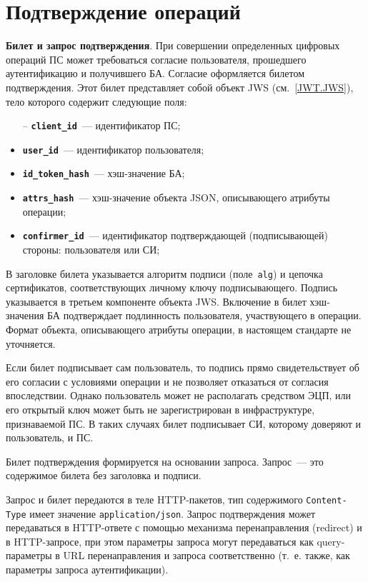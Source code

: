 \section{Подтверждение операций}\label{OIDC.Confirm}

{\bf Билет и запрос подтверждения}.
%
При совершении определенных цифровых операций ПС может требоваться
согласие пользователя, прошедшего аутентификацию и получившего БА. 
Согласие оформляется билетом подтверждения. Этот билет представляет собой 
объект JWS (см.~\ref{JWT.JWS}), тело которого содержит следующие поля: 
\begin{itemize}
\item[--] 
{\bf \lstinline{client_id}}~--- идентификатор ПС;

\item[--] 
{\bf \lstinline{user_id}}~--- идентификатор пользователя;

\item[--] 
{\bf \lstinline{id_token_hash}}~--- хэш-значение БА;

\item[--] 
{\bf \lstinline{attrs_hash}}~--- хэш-значение объекта JSON,
описывающего атрибуты операции; 

\item[--] 
{\bf \lstinline{confirmer_id}}~--- идентификатор
подтверждающей (подписывающей) стороны: пользователя или СИ;
\end{itemize}

В заголовке билета указывается алгоритм подписи (поле~\lstinline{alg})
и цепочка сертификатов, соответствующих личному ключу подписывающего.
Подпись указывается в третьем компоненте объекта JWS.
%
Включение в билет хэш-значения БА подтверждает подлинность 
пользователя, участвующего в операции.
%
Формат объекта, описывающего атрибуты операции, в настоящем стандарте не 
уточняется.

Если билет подписывает сам пользователь, 
то подпись прямо свидетельствует об его согласии с условиями
операции и не позволяет отказаться от согласия впоследствии.
%
Однако пользователь может не располагать средством ЭЦП, или его 
открытый ключ может быть не зарегистрирован в инфраструктуре,
признаваемой ПС. В таких случаях билет подписывает СИ,
которому доверяют и пользователь, и ПС. 

Билет подтверждения формируется на основании запроса.
Запрос~--- это содержимое билета без заголовка и подписи. 

Запрос и билет передаются в теле
HTTP-пакетов, тип содержимого \lstinline{Content-Type}
имеет значение \lstinline{application/json}.
Запрос подтверждения может передаваться
в HTTP-ответе с помощью механизма перенаправления (redirect) и
в HTTP-запросе, при этом параметры запроса могут
передаваться как query-параметры в URL перенаправления и запроса соответственно
(т.~е. также, как параметры запроса аутентификации).

